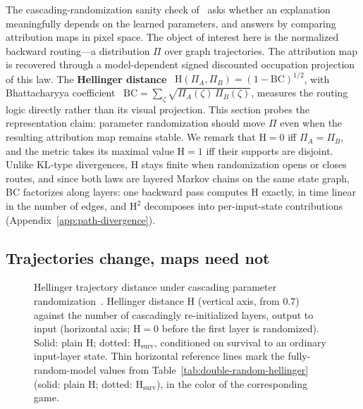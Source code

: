 \documentclass[twoside]{article}
\newcommand{\1}{\mathbf{1}}
\begin{document}
The cascading-randomization sanity check of~\citet{Adebayo2018sanity} asks whether an explanation
meaningfully depends on the learned parameters, and answers by comparing attribution maps in pixel
space. The object of interest here is the normalized backward routing---a distribution $\Pi$ over
graph trajectories. The attribution map is recovered through a model-dependent signed discounted
occupation projection of this law.
The \textbf{Hellinger distance}~\citep{Hellinger1909} $\mathrm{H}(\Pi_A, \Pi_B) = (1 -
    \mathrm{BC})^{1/2}$, with Bhattacharyya coefficient~\citep{Bhattacharyya1943} $\mathrm{BC} =
    \sum_\zeta \sqrt{\Pi_A(\zeta)\,\Pi_B(\zeta)}$, measures the routing logic directly rather than its
visual projection. This section probes the representation claim: parameter randomization should
move $\Pi$ even when the resulting attribution map remains stable. We remark that $\mathrm{H}=0$ iff $\Pi_A
    = \Pi_B$, and the metric takes its maximal value $\mathrm{H}=1$ iff their supports are disjoint.
Unlike KL-type divergences, $\mathrm{H}$ stays finite when randomization opens or closes routes,
and since both laws are layered Markov chains on the same state graph, BC factorizes along layers:
one backward pass computes $\mathrm{H}$ exactly, in time linear in the number of edges, and
$\mathrm{H}^2$ decomposes into per-input-state contributions (Appendix~\ref{app:path-divergence}).

\subsection{Trajectories change, maps need not}\label{sec:hellinger-cascading}

\begin{figure}[t]
    \centering
    
    \caption{Hellinger trajectory distance under cascading parameter
    randomization~\citep{Adebayo2018sanity}. Hellinger distance $\mathrm{H}$ (vertical axis, from
    $0.7$) against the number of cascadingly re-initialized layers, output to input (horizontal axis;
    $\mathrm{H}=0$ before the first layer is randomized). Solid: plain $\mathrm{H}$; dotted:
    $\mathrm{H}_{\mathrm{surv}}$, conditioned on survival to an ordinary input-layer state. Thin
    horizontal reference lines mark the fully-random-model values from
    Table~\ref{tab:double-random-hellinger} (solid: plain $\mathrm{H}$; dotted:
    $\mathrm{H}_{\mathrm{surv}}$), in the color of the corresponding game.}
    \label{fig:hellinger-sanity}
\end{figure}
\end{document}
